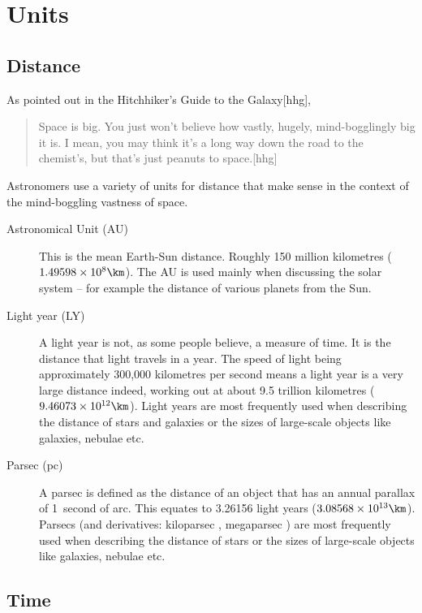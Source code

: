 \section{Units}
\label{sec:Concepts:Units}

\subsection{Distance}
\label{sec:Concepts:Distance}

As  pointed out in the Hitchhiker's Guide to the
Galaxy{[}hhg{]},

\begin{quote}
  Space is big. You just won't believe how vastly, hugely,
  mind-bogglingly big it is. I mean, you may think it's a long way
  down the road to the chemist's, but that's just peanuts to
  space.{[}hhg{]}
\end{quote}
Astronomers use a variety of units for distance that make sense in the
context of the mind-boggling vastness of space.

\begin{description}
\item[Astronomical Unit (AU)] This is the mean Earth-Sun
  distance. Roughly 150 million kilometres
  ($1.49598 \times 10^8\km$). The AU is used mainly when
  discussing the solar system -- for example the distance of various
  planets from the Sun.
\item[Light year (LY)] A light year is not, as some people believe, a
  measure of time. It is the distance that light travels in a
  year. The speed of light being approximately 300,000 kilometres per
  second means a light year is a very large distance indeed, working
  out at about 9.5 trillion kilometres
  ($9.46073\times10^{12}\km$). Light years are most frequently used
  when describing the distance of stars and galaxies or the sizes of
  large-scale objects like galaxies, nebulae etc.
\item[Parsec (pc)] A parsec is defined as the distance of an object
  that has an annual parallax of 1~second of arc. This equates to
  3.26156 light years ($3.08568\times10^{13}\km$). Parsecs (and derivatives: kiloparsec \kpc, megaparsec \Mpc) are most
  frequently used when describing the distance of stars or the sizes
  of large-scale objects like galaxies, nebulae etc.
\end{description}

\subsection{Time}\label{time}

